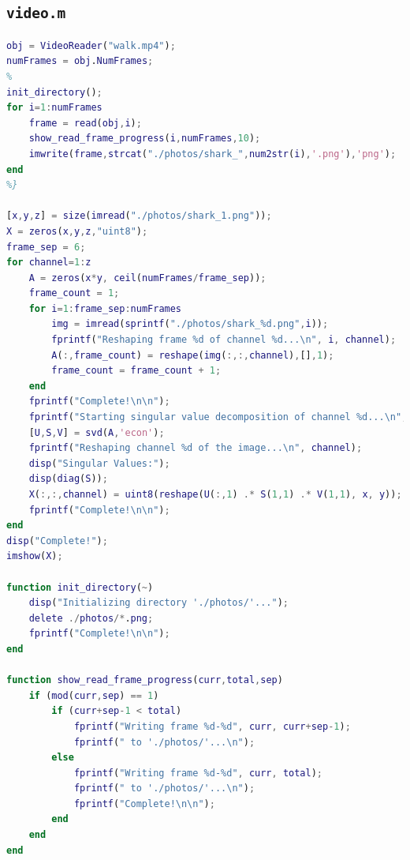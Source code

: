 \documentclass[12pt]{article}
\theoremstyle{definition}
\begin{document}
\subsection*{\texttt{video.m}}
\begin{lstlisting}[language=Matlab, style=mystyle]
% video.m
obj = VideoReader("walk.mp4");
numFrames = obj.NumFrames;
%
init_directory();
for i=1:numFrames
    frame = read(obj,i);
    show_read_frame_progress(i,numFrames,10);
    imwrite(frame,strcat("./photos/shark_",num2str(i),'.png'),'png');
end
%}

[x,y,z] = size(imread("./photos/shark_1.png"));
X = zeros(x,y,z,"uint8");
frame_sep = 6;
for channel=1:z
    A = zeros(x*y, ceil(numFrames/frame_sep));
    frame_count = 1;
    for i=1:frame_sep:numFrames
        img = imread(sprintf("./photos/shark_%d.png",i));
        fprintf("Reshaping frame %d of channel %d...\n", i, channel);
        A(:,frame_count) = reshape(img(:,:,channel),[],1);
        frame_count = frame_count + 1;
    end
    fprintf("Complete!\n\n");
    fprintf("Starting singular value decomposition of channel %d...\n", channel);
    [U,S,V] = svd(A,'econ');
    fprintf("Reshaping channel %d of the image...\n", channel);
    disp("Singular Values:");
    disp(diag(S));
    X(:,:,channel) = uint8(reshape(U(:,1) .* S(1,1) .* V(1,1), x, y));
    fprintf("Complete!\n\n");
end
disp("Complete!");
imshow(X);

function init_directory(~)
    disp("Initializing directory './photos/'...");
    delete ./photos/*.png;
    fprintf("Complete!\n\n");
end

function show_read_frame_progress(curr,total,sep)
    if (mod(curr,sep) == 1)
        if (curr+sep-1 < total)
            fprintf("Writing frame %d-%d", curr, curr+sep-1);
            fprintf(" to './photos/'...\n");
        else
            fprintf("Writing frame %d-%d", curr, total);
            fprintf(" to './photos/'...\n");
            fprintf("Complete!\n\n");
        end        
    end
end
\end{lstlisting}

\nocite{*}
\printbibliography

\end{document}

